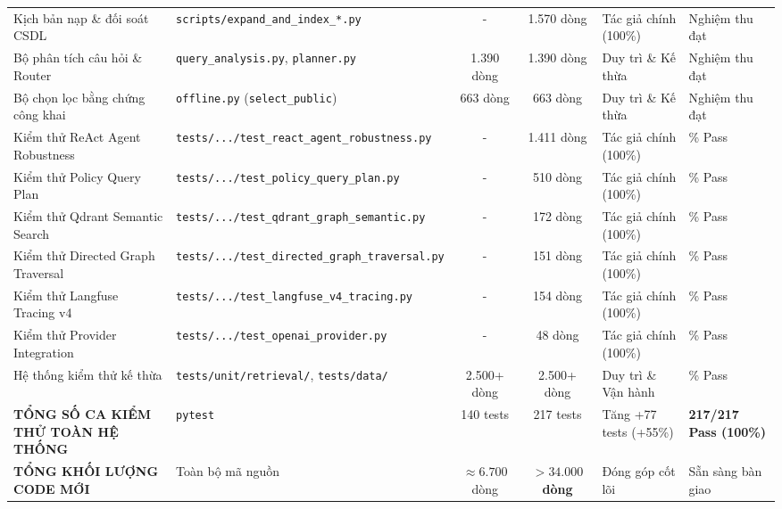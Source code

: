 \documentclass[a4paper,11pt]{article}
\begin{document}
\begin{table}[!htbp]
\begin{tabularx}{\textwidth}{>{\raggedright\arraybackslash}p{3.2cm}>{\raggedright\arraybackslash}Xcc>{\raggedright\arraybackslash}p{2.6cm}>{\raggedright\arraybackslash}p{2.0cm}}
Kịch bản nạp \& đối soát CSDL & \nolinkurl{scripts/expand_and_index_*.py} & - & 1.570 dòng & Tác giả chính (100\%) & Nghiệm thu đạt \\
Bộ phân tích câu hỏi \& Router & \nolinkurl{query_analysis.py}, \nolinkurl{planner.py} & 1.390 dòng & 1.390 dòng & Duy trì \& Kế thừa & Nghiệm thu đạt \\
Bộ chọn lọc bằng chứng công khai & \nolinkurl{offline.py} (\nolinkurl{select_public}) & 663 dòng & 663 dòng & Duy trì \& Kế thừa & Nghiệm thu đạt \\
\midrule
Kiểm thử ReAct Agent Robustness & \nolinkurl{tests/.../test_react_agent_robustness.py} & - & 1.411 dòng & Tác giả chính (100\%) & 100\% Pass \\
Kiểm thử Policy Query Plan & \nolinkurl{tests/.../test_policy_query_plan.py} & - & 510 dòng & Tác giả chính (100\%) & 100\% Pass \\
Kiểm thử Qdrant Semantic Search & \nolinkurl{tests/.../test_qdrant_graph_semantic.py} & - & 172 dòng & Tác giả chính (100\%) & 100\% Pass \\
Kiểm thử Directed Graph Traversal & \nolinkurl{tests/.../test_directed_graph_traversal.py} & - & 151 dòng & Tác giả chính (100\%) & 100\% Pass \\
Kiểm thử Langfuse Tracing v4 & \nolinkurl{tests/.../test_langfuse_v4_tracing.py} & - & 154 dòng & Tác giả chính (100\%) & 100\% Pass \\
Kiểm thử Provider Integration & \nolinkurl{tests/.../test_openai_provider.py} & - & 48 dòng & Tác giả chính (100\%) & 100\% Pass \\
Hệ thống kiểm thử kế thừa & \nolinkurl{tests/unit/retrieval/}, \nolinkurl{tests/data/} & 2.500+ dòng & 2.500+ dòng & Duy trì \& Vận hành & 100\% Pass \\
\midrule
\textbf{TỔNG SỐ CA KIỂM THỬ TOÀN HỆ THỐNG} & \nolinkurl{pytest} & 140 tests & 217 tests & Tăng +77 tests (+55\%) & \textbf{217/217 Pass (100\%)} \\
\textbf{TỔNG KHỐI LƯỢNG CODE MỚI} & Toàn bộ mã nguồn & $\approx 6.700$ dòng & \textbf{$> 34.000$ dòng} & Đóng góp cốt lõi & Sẵn sàng bàn giao \\
\bottomrule
\end{tabularx}
\end{table}

\clearpage
\end{document}
